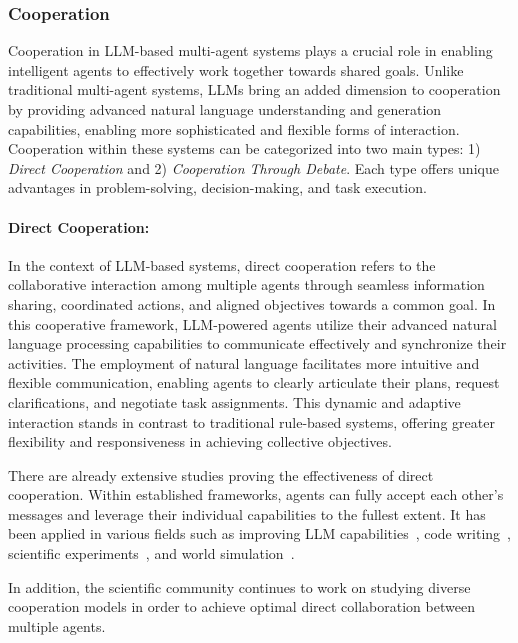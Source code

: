 \subsubsection{Cooperation}

Cooperation in LLM-based multi-agent systems plays a crucial role in enabling intelligent agents to effectively work together towards shared goals. Unlike traditional multi-agent systems, LLMs bring an added dimension to cooperation by providing advanced natural language understanding and generation capabilities, enabling more sophisticated and flexible forms of interaction. Cooperation within these systems can be categorized into two main types: 1) \emph{Direct Cooperation} and 2) \emph{Cooperation Through Debate}. Each type offers unique advantages in problem-solving, decision-making, and task execution.
\paragraph{Direct Cooperation:}

In the context of LLM-based systems, direct cooperation refers to the collaborative interaction among multiple agents through seamless information sharing, coordinated actions, and aligned objectives towards a common goal. In this cooperative framework, LLM-powered agents utilize their advanced natural language processing capabilities to communicate effectively and synchronize their activities. The employment of natural language facilitates more intuitive and flexible communication, enabling agents to clearly articulate their plans, request clarifications, and negotiate task assignments. This dynamic and adaptive interaction stands in contrast to traditional rule-based systems, offering greater flexibility and responsiveness in achieving collective objectives.

There are already extensive studies proving the effectiveness of direct cooperation. Within established frameworks, agents can fully accept each other's messages and leverage their individual capabilities to the fullest extent. It has been applied in various fields such as improving LLM capabilities~\cite{boostrapping,casualgpt_reasoning,autoagents}, code writing~\cite{chatdev_software_development,soa_code_generation,magis_mas_for_github,mas_for_software_2,fixagent_mas_for_debug}, scientific experiments~\cite{chatsim_mas_make_scene,mas_use_tool}, and world simulation~\cite{fincon_decision_making,classroom_simulation,peergpt}.

In addition, the scientific community continues to work on studying diverse cooperation models in order to achieve optimal direct collaboration between multiple agents.~\cite{agentcoord,govsim,mas_benchmark}

